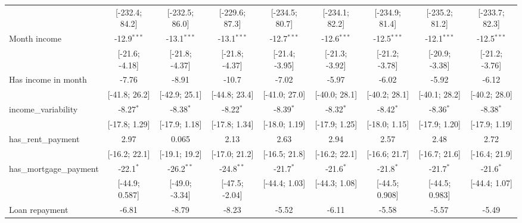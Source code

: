 \begin{table}[htbp]
\begin{threeparttable}[b]
\begin{tabular}{lcccccccc}
                                     & [-232.4; 84.2]  & [-232.5; 86.0]  & [-229.6; 87.3]  & [-234.5; 80.7]  & [-234.1; 82.2]   & [-234.9; 81.4]   & [-235.2; 81.2]   & [-233.7; 82.3]\\   
         Month income                & -12.9$^{***}$   & -13.1$^{***}$   & -13.1$^{***}$   & -12.7$^{***}$   & -12.6$^{***}$    & -12.5$^{***}$    & -12.1$^{***}$    & -12.5$^{***}$\\   
                                     & [-21.6; -4.18]  & [-21.8; -4.37]  & [-21.8; -4.37]  & [-21.4; -3.95]  & [-21.3; -3.92]   & [-21.2; -3.78]   & [-20.9; -3.38]   & [-21.2; -3.76]\\   
         Has income in month         & -7.76           & -8.91           & -10.7           & -7.02           & -5.97            & -6.02            & -5.92            & -6.12\\   
                                     & [-41.8; 26.2]   & [-42.9; 25.1]   & [-44.8; 23.4]   & [-41.0; 27.0]   & [-40.0; 28.1]    & [-40.2; 28.1]    & [-40.1; 28.2]    & [-40.2; 28.0]\\   
         income\_variability         & -8.27$^{*}$     & -8.38$^{*}$     & -8.22$^{*}$     & -8.39$^{*}$     & -8.32$^{*}$      & -8.42$^{*}$      & -8.36$^{*}$      & -8.38$^{*}$\\   
                                     & [-17.8; 1.29]   & [-17.9; 1.18]   & [-17.8; 1.34]   & [-18.0; 1.19]   & [-17.9; 1.25]    & [-18.0; 1.15]    & [-17.9; 1.20]    & [-17.9; 1.19]\\   
         has\_rent\_payment          & 2.97            & 0.065           & 2.13            & 2.63            & 2.94             & 2.57             & 2.48             & 2.72\\   
                                     & [-16.2; 22.1]   & [-19.1; 19.2]   & [-17.0; 21.2]   & [-16.5; 21.8]   & [-16.2; 22.1]    & [-16.6; 21.7]    & [-16.7; 21.6]    & [-16.4; 21.9]\\   
         has\_mortgage\_payment      & -22.1$^{*}$     & -26.2$^{**}$    & -24.8$^{**}$    & -21.7$^{*}$     & -21.6$^{*}$      & -21.8$^{*}$      & -21.7$^{*}$      & -21.6$^{*}$\\   
                                     & [-44.9; 0.587]  & [-49.0; -3.34]  & [-47.5; -2.04]  & [-44.4; 1.03]   & [-44.3; 1.08]    & [-44.5; 0.908]   & [-44.5; 0.983]   & [-44.4; 1.07]\\   
         Loan repayment              & -6.81           & -8.79           & -8.23           & -5.52           & -6.11            & -5.58            & -5.57            & -5.49\\   

\end{tabular}
\end{threeparttable}
\end{table}
